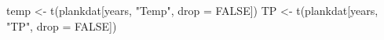 \begin{Schunk}
\begin{Sinput}
 temp <- t(plankdat[years, "Temp", drop = FALSE])
 TP <- t(plankdat[years, "TP", drop = FALSE])
\end{Sinput}
\end{Schunk}
